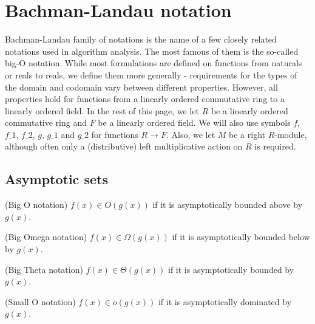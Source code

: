 \section{Bachman-Landau notation}

Bachman-Landau family of notations is the name of a few closely related notations used in 
algorithm analysis. The most famous of them is the so-called big-O notation. While
most formulations are defined on functions from naturals or reals to reals, we define 
them more generally - requirements for the types of the domain and codomain vary between 
different properties. However, all properties hold for functions from a linearly ordered 
commutative ring to a linearly ordered field. In the rest of this page, we let $R$ be a linearly 
ordered commutative ring and $F$ be a linearly ordered field. We will also use symbols $f$, 
$f\_1$, $f\_2$, $g$, $g\_1$ and $g\_2$ for functions $R \to F$. Also, we let $M$ be 
a right $R$-module, although often only a (distributive) left multiplicative 
action on $R$ is required.


\subsection{Asymptotic sets}

\begin{definition}(Big O notation)
    \label{def:big_o}
    \leanok
    $f(x) \in O(g(x))$ if it is asymptotically bounded above by $g(x)$.
\end{definition}

\begin{definition}(Big Omega notation)
    \label{def:big_omega}
    \leanok
    $f(x) \in \Omega(g(x))$ if it is asymptotically bounded below by $g(x)$.
\end{definition}

\begin{definition}(Big Theta notation)
    \label{def:theta}
    \leanok
    $f(x) \in \Theta(g(x))$ if it is asymptotically bounded by $g(x)$. 
\end{definition}

\begin{definition}(Small O notation)
    \label{def:small_o}
    \leanok
    $f(x) \in o(g(x))$ if it is asymptotically dominated by $g(x)$.
\end{definition}

